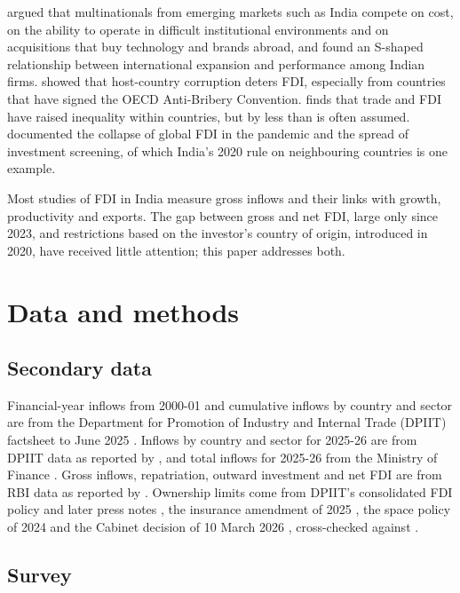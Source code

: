 \documentclass[sn-basic]{sn-jnl}
\begin{document}
\citet{ramamurti2012} argued that multinationals from emerging markets such as India compete on cost, on the ability to operate in difficult institutional environments and on acquisitions that buy technology and brands abroad, and \citet{contractor2007} found an S-shaped relationship between international expansion and performance among Indian firms. \citet{cuervo2006} showed that host-country corruption deters FDI, especially from countries that have signed the OECD Anti-Bribery Convention. \citet{helpman2018} finds that trade and FDI have raised inequality within countries, but by less than is often assumed. \citet{unctad2020} documented the collapse of global FDI in the pandemic and the spread of investment screening, of which India's 2020 rule on neighbouring countries is one example.

Most studies of FDI in India measure gross inflows and their links with growth, productivity and exports. The gap between gross and net FDI, large only since 2023, and restrictions based on the investor's country of origin, introduced in 2020, have received little attention; this paper addresses both.

\section{Data and methods}\label{sec:methods}

\subsection{Secondary data}

Financial-year inflows from 2000-01 and cumulative inflows by country and sector are from the Department for Promotion of Industry and Internal Trade (DPIIT) factsheet to June 2025 \citep{dpiit2025}. Inflows by country and sector for 2025-26 are from DPIIT data as reported by \citet{indiabriefing2026}, and total inflows for 2025-26 from the Ministry of Finance \citep{indiatribune2026}. Gross inflows, repatriation, outward investment and net FDI are from RBI data as reported by \citet{bs2024net,bs2025net,bs2026net}. Ownership limits come from DPIIT's consolidated FDI policy and later press notes \citep{dpiit2020}, the insurance amendment of 2025 \citep{pib2025insurance}, the space policy of 2024 and the Cabinet decision of 10 March 2026 \citep{air2026pn3}, cross-checked against \citet{beacon2026}.

\subsection{Survey}
\end{document}
